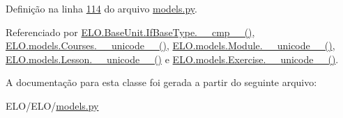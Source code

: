 Definição na linha \hyperlink{ELO_2models_8py_source_l00114}{114} do arquivo \hyperlink{ELO_2models_8py_source}{models.\-py}.



Referenciado por \hyperlink{classELO_1_1BaseUnit_1_1IfBaseType_a69c338f6f1574bd3524e9d59ebc17a7c}{E\-L\-O.\-Base\-Unit.\-If\-Base\-Type.\-\_\-\-\_\-cmp\-\_\-\-\_\-()}, \hyperlink{classELO_1_1models_1_1Courses_a8926a37152be8d4fc3e0ba6af200f871}{E\-L\-O.\-models.\-Courses.\-\_\-\-\_\-unicode\-\_\-\-\_\-()}, \hyperlink{classELO_1_1models_1_1Module_a1b54aa7a5e8dac090dea0926eca5550d}{E\-L\-O.\-models.\-Module.\-\_\-\-\_\-unicode\-\_\-\-\_\-()}, \hyperlink{classELO_1_1models_1_1Lesson_a3d9f0295dbe1ed5c74668d6c0876f97c}{E\-L\-O.\-models.\-Lesson.\-\_\-\-\_\-unicode\-\_\-\-\_\-()} e \hyperlink{classELO_1_1models_1_1Exercise_af3e991e5610cec815a2c3260ec6aae0b}{E\-L\-O.\-models.\-Exercise.\-\_\-\-\_\-unicode\-\_\-\-\_\-()}.



A documentação para esta classe foi gerada a partir do seguinte arquivo\-:\begin{DoxyCompactItemize}
\item 
E\-L\-O/\-E\-L\-O/\hyperlink{ELO_2models_8py}{models.\-py}\end{DoxyCompactItemize}
